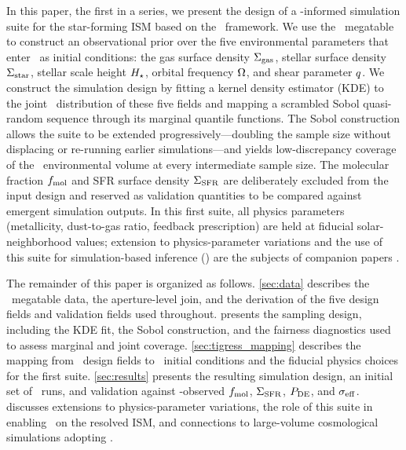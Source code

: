 In this paper, the first in a series, we present the design of a
\PHANGS-informed simulation suite for the star-forming ISM based on the
\TIGRESS\ framework. We use the \PHANGS\ megatable
\citep{2022AJ....164...43S} to construct an observational prior over the
five environmental parameters that enter \TIGRESS\ as initial conditions:
the gas surface density $\Sigma_{\rm gas}$, stellar surface density $\Sigma_{\rm star}$,
stellar scale height $H_\star$, orbital frequency $\Omega$, and shear
parameter $q$. We construct the simulation design by fitting a
kernel density estimator (KDE) to the joint \PHANGS\ distribution of these
five fields and mapping a scrambled Sobol quasi-random sequence through
its marginal quantile functions. The Sobol construction allows the suite
to be extended progressively---doubling the sample size without displacing
or re-running earlier simulations---and yields low-discrepancy coverage of
the \PHANGS\ environmental volume at every intermediate sample size. The
molecular fraction $f_{\rm mol}$ and SFR surface density $\Sigma_{\rm SFR}$ are
deliberately excluded from the input design and reserved as validation
quantities to be compared against emergent simulation outputs. In this
first suite, all physics parameters (metallicity, dust-to-gas ratio,
feedback prescription) are held at fiducial solar-neighborhood values;
extension to physics-parameter variations and the use of this suite for
simulation-based inference (\SBI) are the subjects of companion papers
.

The remainder of this paper is organized as follows. \autoref{sec:data}
describes the \PHANGS\ megatable data, the aperture-level join, and the
derivation of the five design fields and validation fields used throughout.
 presents the sampling design, including the KDE fit, the
Sobol construction, and the fairness diagnostics used to assess marginal
and joint coverage. \autoref{sec:tigress_mapping} describes the mapping
from \PHANGS\ design fields to \TIGRESS\ initial conditions and the
fiducial physics choices for the first suite. \autoref{sec:results}
presents the resulting simulation design, an initial set of \TIGRESS\ runs,
and validation against \PHANGS-observed $f_{\rm mol}$, $\Sigma_{\rm SFR}$, $P_{\rm DE}$, and
$\sigma_{\rm eff}$.  discusses extensions to physics-parameter
variations, the role of this suite in enabling \SBI\ on the resolved ISM,
and connections to large-volume cosmological simulations adopting \PRFM.
